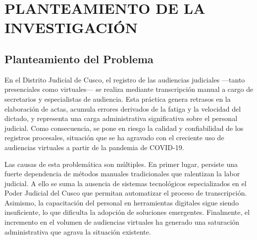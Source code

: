 \documentclass[12pt,a4paper,oneside]{report}
\begin{document}
\newpage
\thispagestyle{empty}
\mbox{}

\newpage
\tableofcontents

\newpage
\listoftables
{}

\newpage
\setcounter{page}{1}

\chapter{PLANTEAMIENTO DE LA INVESTIGACIÓN}

\section{Planteamiento del Problema}

En el Distrito Judicial de Cusco, el registro de las audiencias judiciales ---tanto presenciales como virtuales--- se realiza mediante transcripción manual a cargo de secretarios y especialistas de audiencia. Esta práctica genera retrasos en la elaboración de actas, acumula errores derivados de la fatiga y la velocidad del dictado, y representa una carga administrativa significativa sobre el personal judicial. Como consecuencia, se pone en riesgo la calidad y confiabilidad de los registros procesales, situación que se ha agravado con el creciente uso de audiencias virtuales a partir de la pandemia de COVID-19.

Las causas de esta problemática son múltiples. En primer lugar, persiste una fuerte dependencia de métodos manuales tradicionales que ralentizan la labor judicial. A ello se suma la ausencia de sistemas tecnológicos especializados en el Poder Judicial del Cusco que permitan automatizar el proceso de transcripción. Asimismo, la capacitación del personal en herramientas digitales sigue siendo insuficiente, lo que dificulta la adopción de soluciones emergentes. Finalmente, el incremento en el volumen de audiencias virtuales ha generado una saturación administrativa que agrava la situación existente.
\end{document}
